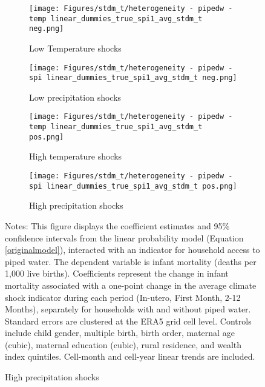 \documentclass[a4paper]{article}
\begin{document}
\begin{figure}[t!]
    \caption{Piped Water prevents mortal diseases}
    \label{fig:pipedwater_heterogeneity}
    \begin{center}
    \begin{subfigure}[t]{0.4\textwidth}
        \centering
        \texttt{[image: Figures/stdm\_t/heterogeneity - pipedw - temp linear\_dummies\_true\_spi1\_avg\_stdm\_t neg.png]}
        \caption{Low Temperature shocks}
    \end{subfigure}%
    \begin{subfigure}[t]{0.4\textwidth}
        \centering
        \texttt{[image: Figures/stdm\_t/heterogeneity - pipedw - spi linear\_dummies\_true\_spi1\_avg\_stdm\_t neg.png]}
        \caption{Low precipitation shocks}
    \end{subfigure} \hfill
    \begin{subfigure}[t]{0.4\textwidth}
        \centering
        \texttt{[image: Figures/stdm\_t/heterogeneity - pipedw - temp linear\_dummies\_true\_spi1\_avg\_stdm\_t pos.png]}
        \caption{High temperature shocks}    
    \end{subfigure}
    \begin{subfigure}[t]{0.4\textwidth}
        \centering
        \texttt{[image: Figures/stdm\_t/heterogeneity - pipedw - spi linear\_dummies\_true\_spi1\_avg\_stdm\_t pos.png]}
        \caption{High precipitation shocks}    
    \end{subfigure}
    \end{center}
    \footnotesize{Notes: This figure displays the coefficient estimates and 95\% confidence intervals from the linear probability model (Equation \ref{originalmodel}), interacted with an indicator for household access to piped water. The dependent variable is infant mortality (deaths per 1,000 live births). Coefficients represent the change in infant mortality associated with a one-point change in the average climate shock indicator during each period (In-utero, First Month, 2-12 Months), separately for households with and without piped water. Standard errors are clustered at the ERA5 grid cell level. Controls include child gender, multiple birth, birth order, maternal age (cubic), maternal education (cubic), rural residence, and wealth index quintiles. Cell-month and cell-year linear trends are included.}
\end{figure}
\end{document}
